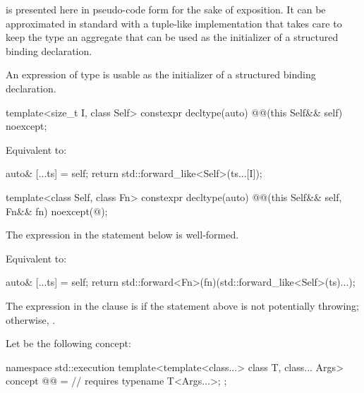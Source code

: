 \pnum
\begin{note}
 is presented here in pseudo-code form
for the sake of exposition.
It can be approximated in standard \Cpp{} with a tuple-like implementation
that takes care to keep the type an aggregate
that can be used as the initializer of a structured binding declaration.
\end{note}
\begin{note}
An expression of type  is usable as
the initializer of a structured binding declaration.
\end{note}

\begin{itemdecl}
template<size_t I, class Self>
constexpr decltype(auto) @@(this Self&& self) noexcept;
\end{itemdecl}

\begin{itemdescr}
\pnum
\effects
Equivalent to:
\begin{codeblock}
auto& [...ts] = self;
return std::forward_like<Self>(ts...[I]);
\end{codeblock}
\end{itemdescr}

\begin{codeblock}
template<class Self, class Fn>
constexpr decltype(auto) @@(this Self&& self, Fn&& fn) noexcept(@\seebelow@);
\end{codeblock}

\begin{itemdescr}
\pnum
\constraints
The expression in the  statement below is well-formed.

\pnum
\effects
Equivalent to:
\begin{codeblock}
auto& [...ts] = self;
return std::forward<Fn>(fn)(std::forward_like<Self>(ts)...);
\end{codeblock}

\pnum
\remarks
The expression in the  clause is 
if the  statement above is not potentially throwing;
otherwise, .
\end{itemdescr}

\pnum
Let  be the following concept:
\begin{codeblock}
namespace std::execution {
  template<template<class...> class T, class... Args>
  concept @@ =                                // \expos
    requires { typename T<Args...>; };
}
\end{codeblock}

